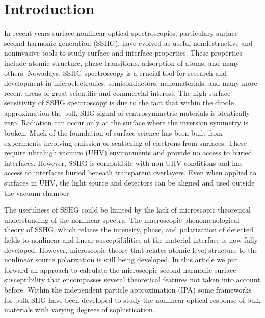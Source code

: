 \documentclass[floatfix,prb,aps,superscriptaddress,11pt,preprint,letterpaper]{revtex4}
\begin{document}
\maketitle

\section{Introduction}\label{intro}

In recent years surface nonlinear optical spectroscopies, particulary surface 
second-harmonic generation (SSHG), have evolved as useful nondestructive 
and noninvasive tools to study surface and interface properties. These 
properties include atomic structure, phase transitions, adsorption of 
atoms, and many others.\cite{daumPRL93, mcgilpOE94, meyerPRL95, powerPRL95, 
godefroyAPL96, hoferAPA96, dadapPRB97, bloembergenAPB99, mcgilpSRL99, 
suzukiAPB99, mitchellSS01, hughesPRB96, guyotPRB88, downerPSSA01, shenAPB99, 
shenNAT89, chenPRL81, mendozaPRL98, downerSIA01} Nowadays, SSHG spectroscopy 
is a crucial tool for research and development in microelectronics,
\cite{zheltikovLP00} semiconductors, \cite{lupkeSSR99} nanomaterials,
\cite{salazar-aparicioPRB14} and many more recent areas of great scientific 
and commercial interest.\cite{cazzanelliNM14} The high surface sensitivity 
of SSHG spectroscopy is due to the fact that within the dipole approximation 
the bulk SHG signal of centrosymmetric materials is identically zero. 
Radiation can occur only at the surface where the inversion symmetry is 
broken. Much of the foundation of surface science has been built from 
experiments involving emission or scattering of electrons from surfaces. 
These require ultrahigh vacuum (UHV) environments and provide no access to 
buried interfaces. However, SSHG is compatibile with non-UHV conditions and 
has access to interfaces buried beneath transparent overlayers. Even when 
applied to surfaces in UHV, the light source and detectors can be aligned and
used outside the vacuum chamber. 

The usefulness of SSHG could be limited by the lack of microscopic theoretical
understanding of the nonlinear spectra. The macroscopic phenomenological 
theory of SSHG, which relates the intensity, phase, and polarization of 
detected fields to nonlinear and linear susceptibilities at the material 
interface is now fully developed. However, microscopic theory that relates 
atomic-level structure to the nonlinear source polarization is still being 
developed. In this article we put forward an approach to calculate the
microscopic second-harmonic surface susceptibility that encompasses several
theoretical features not taken into account before. Within the independent 
particle approximation (IPA) some frameworks for bulk SHG have been developed 
to study the nonlinear optical response of bulk materials with varying degrees 
of sophistication.\cite{butcherPOPS63, aspnesPRB72, sipePRB93, levinePRB94,
aversaPRB95, hughesPRB96, rashkeevPRB98} 
\end{document}
